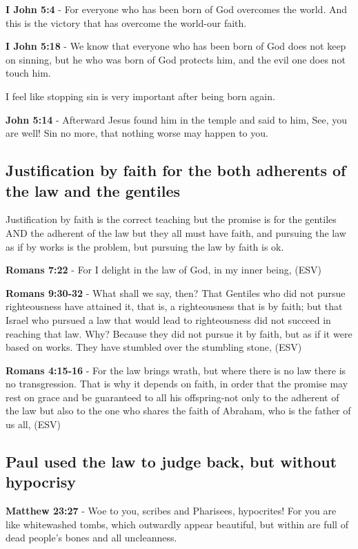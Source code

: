 \documentclass[11pt]{article}
\begin{document}
\textbf{I John 5:4} - For everyone who has been born of God overcomes the world. And this is the victory that has overcome the world-our faith.

\textbf{I John 5:18} - We know that everyone who has been born of God does not keep on sinning, but he who was born of God protects him, and the evil one does not touch him.

I feel like stopping sin is very important after being born again.

\textbf{John 5:14} - Afterward Jesus found him in the temple and said to him, See, you are well! Sin no more, that nothing worse may happen to you.

\subsection{Justification by faith for the both adherents of the law and the gentiles}
\label{sec:orge398e48}
Justification by faith is the correct teaching but the promise is for the gentiles AND the adherent of the law but they all must have faith, and pursuing the law as if by works is the problem, but pursuing the law by faith is ok.

\textbf{Romans 7:22} - For I delight in the law of God, in my inner being, (ESV)

\textbf{Romans 9:30-32} - What shall we say, then? That Gentiles who did not pursue righteousness have attained it, that is, a righteousness that is by faith; but that Israel who pursued a law that would lead to righteousness did not succeed in reaching that law. Why? Because they did not pursue it by faith, but as if it were based on works. They have stumbled over the stumbling stone, (ESV)

\textbf{Romans 4:15-16} - For the law brings wrath, but where there is no law there is no transgression. That is why it depends on faith, in order that the promise may rest on grace and be guaranteed to all his offspring-not only to the adherent of the law but also to the one who shares the faith of Abraham, who is the father of us all, (ESV)

\subsection{Paul used the law to judge back, but without hypocrisy}
\label{sec:org3422fda}
\textbf{Matthew 23:27} - Woe to you, scribes and Pharisees, hypocrites! For you are like whitewashed tombs, which outwardly appear beautiful, but within are full of dead people's bones and all uncleanness.
\end{document}
